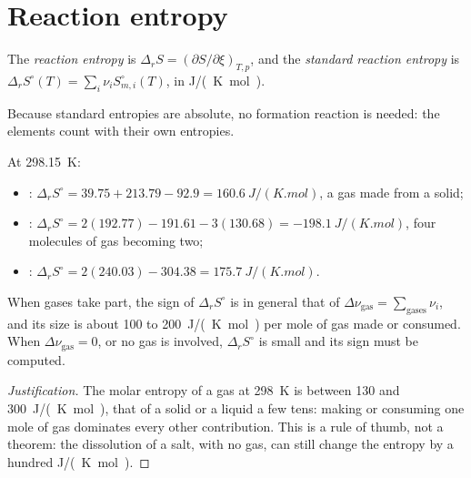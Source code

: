\section{Reaction entropy}

\begin{definition}\label{def:b2:reaction-free-energy:reaction-entropy}
The \emph{reaction entropy} is $\Delta_r S =
(\partial S/\partial\xi)_{T,p}$, and the \emph{standard reaction
entropy} is $\Delta_r S^\circ(T) =
\sum_i\nu_iS^\circ_{m,i}(T)$, in \unit{J/(K.mol)}.
\end{definition}

Because standard entropies are absolute, no formation reaction is needed:
the elements count with their own entropies.

\begin{example}\label{ex:b2:reaction-free-energy:entropies}
At \qty{298.15}{K}:
\begin{itemize}
  \item {}: $\Delta_r S^\circ = 39.75 + 213.79 -
        92.9 = \qty{+160.6}{J/(K.mol)}$, a gas made from a solid;
  \item {}: $\Delta_r S^\circ = 2(192.77) -
        191.61 - 3(130.68) = \qty{-198.1}{J/(K.mol)}$, four molecules of gas
        becoming two;
  \item {}: $\Delta_r S^\circ = 2(240.03) - 304.38 =
        \qty{+175.7}{J/(K.mol)}$.
\end{itemize}
\end{example}

\begin{proposition}\label{prop:b2:reaction-free-energy:sign-rule}
When gases take part, the sign of $\Delta_r S^\circ$ is in general that of
$\Delta\nu_{\text{gas}} = \sum_{\text{gases}}\nu_i$, and its size is about
\qty{100}{} to \qty{200}{J/(K.mol)} per mole of gas made or consumed. When
$\Delta\nu_{\text{gas}} = 0$, or no gas is involved, $\Delta_r S^\circ$ is
small and its sign must be computed.
\end{proposition}

\begin{proof}[Justification]
The molar entropy of a gas at \qty{298}{K} is between 130 and
\qty{300}{J/(K.mol)}, that of a solid or a liquid a few tens: making or
consuming one mole of gas dominates every other contribution. This is a
rule of thumb, not a theorem: the dissolution of a salt, with no gas, can
still change the entropy by a hundred \unit{J/(K.mol)}.
\end{proof}

